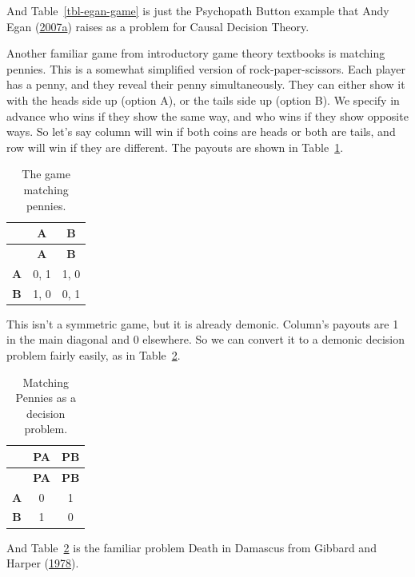 \documentclass[
  12pt,
  letterpaper,
  DIV=11,
  numbers=noendperiod]{scrreprt}
\begin{document}
And Table~\ref{tbl-egan-game} is just the Psychopath Button example that
Andy Egan (\protect\hyperlink{ref-Egan2007}{2007a}) raises as a problem
for Causal Decision Theory.

Another familiar game from introductory game theory textbooks is
matching pennies. This is a somewhat simplified version of
rock-paper-scissors. Each player has a penny, and they reveal their
penny simultaneously. They can either show it with the heads side up
(option A), or the tails side up (option B). We specify in advance who
wins if they show the same way, and who wins if they show opposite ways.
So let's say column will win if both coins are heads or both are tails,
and row will win if they are different. The payouts are shown in
Table~\ref{tbl-match-pennies}.

\hypertarget{tbl-match-pennies}{}
\begin{longtable}[]{@{}ccc@{}}
\caption{\label{tbl-match-pennies}The game matching
pennies.}\tabularnewline
\toprule\noalign{}
& \textbf{A} & \textbf{B} \\
\midrule\noalign{}
\endfirsthead
\toprule\noalign{}
& \textbf{A} & \textbf{B} \\
\midrule\noalign{}
\endhead
\bottomrule\noalign{}
\endlastfoot
\textbf{A} & 0, 1 & 1, 0 \\
\textbf{B} & 1, 0 & 0, 1 \\
\end{longtable}

This isn't a symmetric game, but it is already demonic. Column's payouts
are 1 in the main diagonal and 0 elsewhere. So we can convert it to a
demonic decision problem fairly easily, as in
Table~\ref{tbl-death-in-damascus}.

\hypertarget{tbl-death-in-damascus}{}
\begin{longtable}[]{@{}ccc@{}}
\caption{\label{tbl-death-in-damascus}Matching Pennies as a decision
problem.}\tabularnewline
\toprule\noalign{}
& \textbf{PA} & \textbf{PB} \\
\midrule\noalign{}
\endfirsthead
\toprule\noalign{}
& \textbf{PA} & \textbf{PB} \\
\midrule\noalign{}
\endhead
\bottomrule\noalign{}
\endlastfoot
\textbf{A} & 0 & 1 \\
\textbf{B} & 1 & 0 \\
\end{longtable}

And Table~\ref{tbl-death-in-damascus} is the familiar problem Death in
Damascus from Gibbard and Harper
(\protect\hyperlink{ref-GibbardHarper1978}{1978}).
\end{document}
